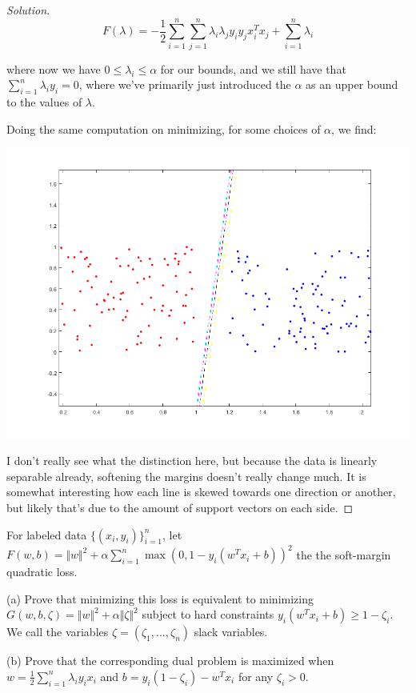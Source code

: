 \documentclass[10pt]{article}
\newenvironment{problem}[2][]{\begin{trivlist}
\item[\hskip \labelsep {\bfseries #1}\hskip \labelsep {\bfseries #2.}]}{\end{trivlist}}
\begin{document}
\begin{proof}[Solution]
$$F( \lambda) = -\frac{1}{2} \sum_{i=1}^n \sum_{j=1}^n \lambda_i \lambda_j y_i y_j x_i^T x_j + \sum_{i=1}^n \lambda_i $$

where now we have $0 \leq \lambda_i \leq \alpha$ for our bounds, and we still have that $\sum_{i=1}^n \lambda_i y_i = 0$, where we've primarily just introduced the $\alpha$ as an upper bound to the values of $\lambda$.

Doing the same computation on minimizing, for some choices of $\alpha$, we find:

\begin{center}
\includegraphics[width=\linewidth]{dual_soft_svm}
\end{center}

I don't really see what the distinction here, but because the data is linearly separable already, softening the margins doesn't really change much. It is somewhat interesting how each line is skewed towards one direction or another, but likely that's due to the amount of support vectors on each side.

\end{proof}

\begin{problem}{Question 2}

For labeled data $\{ (x_i, y_i) \}_{i=1}^n$, let $F(w,b) = \Vert w \Vert^2 + \alpha \sum_{i=1}^n \max(0,1 - y_i(w^T x_i + b))^2$ the the soft-margin quadratic loss.

(a) Prove that minimizing this loss is equivalent to minimizing $G(w,b,\zeta) = \Vert w \Vert^2 + \alpha \Vert \zeta \Vert^2$ subject to hard constraints $y_i (w^T x_i + b) \geq 1 - \zeta_i$. We call the variables $\zeta = (\zeta_1,...,\zeta_n)$ slack variables.

(b) Prove that the corresponding dual problem is maximized when $w = \frac{1}{2} \sum_{i=1}^n \lambda_i y_i x_i$ and $b = y_i (1 - \zeta_i) - w^T x_i $ for any $\zeta_i > 0$. 

\end{problem}
\end{document}
